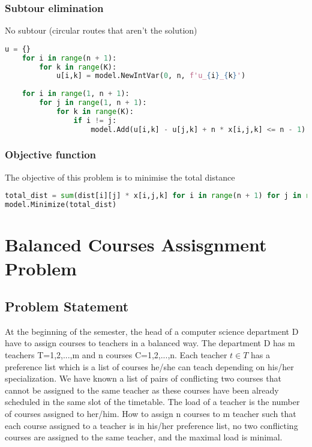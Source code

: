 \documentclass{article}
\begin{document}
\subsubsection{Subtour elimination}
No subtour (circular routes that aren't the solution)
\begin{lstlisting}[language=Python]
    u = {}
    for i in range(n + 1):
        for k in range(K):
            u[i,k] = model.NewIntVar(0, n, f'u_{i}_{k}')
    
    for i in range(1, n + 1):
        for j in range(1, n + 1):
            for k in range(K):
                if i != j:
                    model.Add(u[i,k] - u[j,k] + n * x[i,j,k] <= n - 1)
\end{lstlisting}

\subsubsection{Objective function}
The objective of this problem is to minimise the total distance
\begin{lstlisting}[language=Python]
total_dist = sum(dist[i][j] * x[i,j,k] for i in range(n + 1) for j in range(n + 1) for k in range(K) if i != j)
model.Minimize(total_dist)
\end{lstlisting}


\section{Balanced Courses Assisgnment Problem}
\subsection{Problem Statement}
At the beginning of the semester, the head of a computer science department D have to assign courses to teachers in a balanced way. The department D has m teachers T={1,2,...,m} and n courses C={1,2,...,n}. Each teacher $t \in T$ has a preference list which is a list of courses he/she can teach depending on his/her specialization. We have known a list of pairs of conflicting two courses that cannot be assigned to the same teacher as these courses have been already scheduled in the same slot of the timetable. The load of a teacher is the number of courses assigned to her/him. How to assign n courses to m teacher such that each course assigned to a teacher is in his/her preference list, no two conflicting courses are assigned to the same teacher, and the maximal load is minimal.
\end{document}
